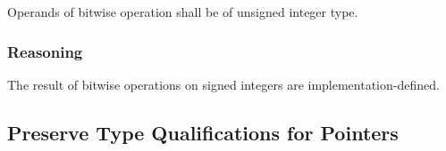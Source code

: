\documentclass{article}
\begin{document}
Operands of bitwise operation shall be of unsigned integer type.

\subsubsection{Reasoning}

The result of bitwise operations on signed integers are implementation-defined.

\subsection{Preserve Type Qualifications for Pointers}





\end{document}
